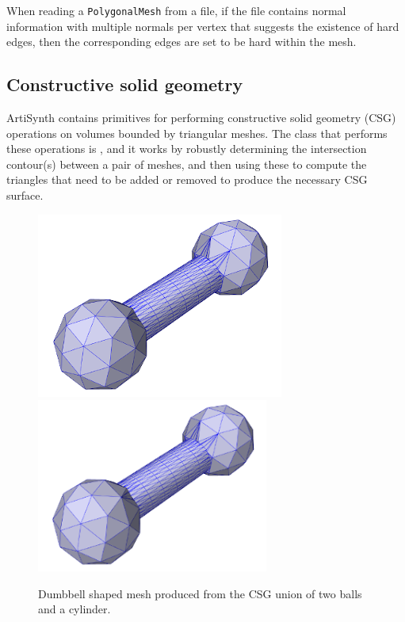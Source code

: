 When reading a {\tt PolygonalMesh} from a file, if the file contains
normal information with multiple normals per vertex that suggests the
existence of hard edges, then the corresponding edges are set to be
hard within the mesh.

\subsection{Constructive solid geometry}
\label{CSG:sec}

ArtiSynth contains primitives for performing constructive solid
geometry (CSG) operations on volumes bounded by triangular meshes. The
class that performs these operations is
, and it works by
robustly determining the intersection contour(s) between a pair of
meshes, and then using these to compute the triangles that need to be
added or removed to produce the necessary CSG surface.

\begin{figure}[th]
\begin{center}
\iflatexml
 \includegraphics[]{images/dumbbellMeshUnion}
\else
 \includegraphics[width=3in]{images/dumbbellMeshUnion}
\fi
\end{center}
\caption{Dumbbell shaped mesh produced from the CSG union of
two balls and a cylinder.}
\label{dumbbellMeshUnion:fig}
\end{figure}

